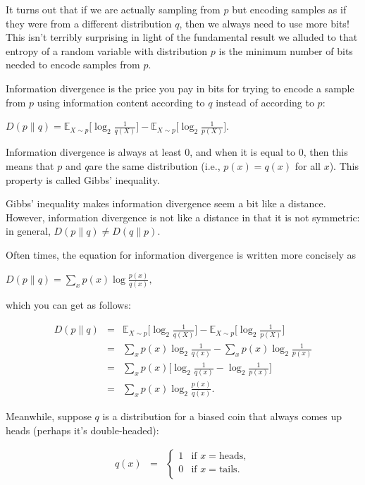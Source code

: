 \documentclass[6008notes.tex]{subfiles}
\begin{document}
It turns out that if we are actually sampling from $p$ but encoding samples as if they were from a different distribution $q$, then we always need to use more bits! This isn't terribly surprising in light of the fundamental result we alluded to that entropy of a random variable with distribution $p$ is the minimum number of bits needed to encode samples from $p$.

Information divergence is the price you pay in bits for trying to encode a sample from $p$ using information content according to $q$ instead of according to $p$:

{\centering$D(p\parallel q)=\mathbb {E}_{X \sim p}\Big[\log _{2}\frac{1}{q(X)}\Big]-\mathbb {E}_{X \sim p}\Big[\log _{2}\frac{1}{p(X)}\Big].$ \par}
 
Information divergence is always at least 0, and when it is equal to 0, then this means that $p$ and $q$are the same distribution (i.e., $p(x)=q(x)$ for all $x$). This property is called Gibbs' inequality.

Gibbs' inequality makes information divergence seem a bit like a distance. However, information divergence is not like a distance in that it is not symmetric: in general, $D(p \parallel q) \ne D(q \parallel p)$.

Often times, the equation for information divergence is written more concisely as

{\centering$D(p\parallel q) = \sum _ x p(x) \log \frac{p(x)}{q(x)},$ \par}
 
which you can get as follows:

\begin{eqnarray*}
D(p\parallel q)
&=&
  \mathbb{E}_{X \sim p}\Big[\log_{2}\frac{1}{q(X)}\Big]
- \mathbb{E}_{X \sim p}\Big[\log_{2}\frac{1}{p(X)}\Big] \\
&=&
  \sum_x p(x) \log_2 \frac{1}{q(x)}
- \sum_x p(x) \log_2 \frac{1}{p(x)} \\
&=&
  \sum_x p(x)
  \Big[ \log_2 \frac{1}{q(x)} - \log_2 \frac{1}{p(x)} \Big] \\
&=&
  \sum_x p(x)
  \log_2 \frac{p(x)}{q(x)}.
\end{eqnarray*}

Meanwhile, suppose $q$ is a distribution for a biased coin that always comes up heads (perhaps it's double-headed):

\begin{eqnarray*}
q(x)
&=&
\begin{cases}
1 & \text{if }x=\text{heads}, \\
0 & \text{if }x=\text{tails}. \\
\end{cases}
\end{eqnarray*}
\end{document}
